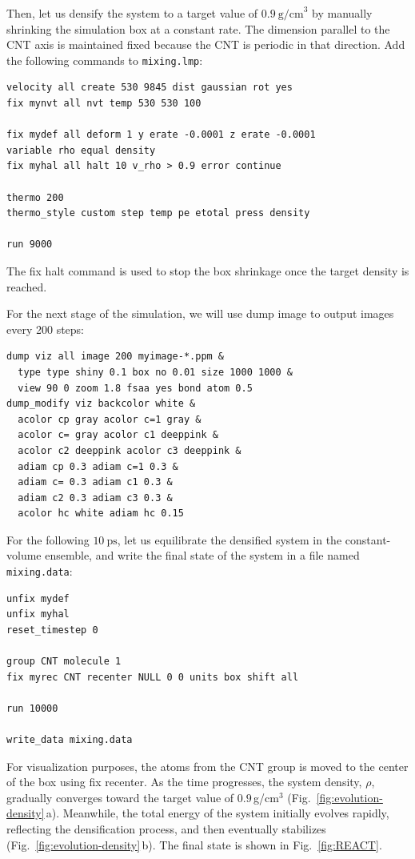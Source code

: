 \documentclass[9pt,tutorial]{livecoms}
\newcommand{\lmpcmd}[1]{\hspace{0pt}\colorbox{listing}{\textcolor{command}{\small{#1}}}\hspace{0pt}} %
\newcommand{\flecmd}[1]{\textcolor{command}{\texttt{#1}}} %
\begin{document}
Then, let us densify the system to a target value of $0.9~\text{g/cm}^3$
by manually shrinking the simulation box at a constant rate.  The dimension parallel
to the CNT axis is maintained fixed because the CNT is periodic in that direction.
Add the following commands to \flecmd{mixing.lmp}:
\begin{lstlisting}
velocity all create 530 9845 dist gaussian rot yes
fix mynvt all nvt temp 530 530 100

fix mydef all deform 1 y erate -0.0001 z erate -0.0001
variable rho equal density
fix myhal all halt 10 v_rho > 0.9 error continue

thermo 200
thermo_style custom step temp pe etotal press density

run 9000
\end{lstlisting}
The \lmpcmd{fix halt} command is used to stop the box shrinkage once the
target density is reached.

For the next stage of the simulation, we will use \lmpcmd{dump image} to
output images every 200 steps:
\begin{lstlisting}
dump viz all image 200 myimage-*.ppm &
  type type shiny 0.1 box no 0.01 size 1000 1000 &
  view 90 0 zoom 1.8 fsaa yes bond atom 0.5
dump_modify viz backcolor white &
  acolor cp gray acolor c=1 gray &
  acolor c= gray acolor c1 deeppink &
  acolor c2 deeppink acolor c3 deeppink &
  adiam cp 0.3 adiam c=1 0.3 &
  adiam c= 0.3 adiam c1 0.3 &
  adiam c2 0.3 adiam c3 0.3 &
  acolor hc white adiam hc 0.15
\end{lstlisting}
For the following $10~\text{ps}$, let us equilibrate the densified system
in the constant-volume ensemble, and write the final state of the
system in a file named \flecmd{mixing.data}:
\begin{lstlisting}
unfix mydef
unfix myhal
reset_timestep 0

group CNT molecule 1
fix myrec CNT recenter NULL 0 0 units box shift all

run 10000

write_data mixing.data
\end{lstlisting}
For visualization purposes, the atoms from the CNT \lmpcmd{group} is moved
to the center of the box using \lmpcmd{fix recenter}.
As the time progresses, the system density,
$\rho$, gradually converges toward the {\color{blue}target value of $0.9$\,g/cm$^3$} (Fig.~\ref{fig:evolution-density}\,a).
Meanwhile, the total energy of the system initially evolves rapidly, reflecting the
densification process, and then eventually stabilizes (Fig.~\ref{fig:evolution-density}\,b).
The final state is shown in Fig.~\ref{fig:REACT}.
\end{document}
